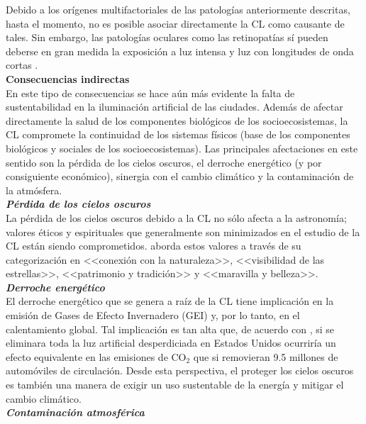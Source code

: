 Debido a los orígenes multifactoriales de las patologías anteriormente descritas, hasta el momento, no es posible asociar directamente la CL como causante de tales. Sin embargo, las patologías oculares como las retinopatías sí pueden deberse en gran medida la exposición a luz intensa y luz con longitudes de onda cortas \citep{CEI2017}.\\


\textbf{Consecuencias indirectas}\\ 

En este tipo de consecuencias se hace aún más evidente la falta de sustentabilidad en la iluminación artificial de las ciudades. Además de afectar directamente la salud de los componentes biológicos de los socioecosistemas, la CL compromete la continuidad de los sistemas físicos (base de los componentes biológicos y sociales de los socioecosistemas). Las principales afectaciones en este sentido son la pérdida de los cielos oscuros, el derroche energético (y por consiguiente económico), sinergia con el cambio climático y la contaminación de la atmósfera.\\ 


\textit{\textbf{Pérdida de los cielos oscuros}}\\ 

La pérdida de los cielos oscuros debido a la CL no sólo afecta a la astronomía; valores éticos y espirituales que generalmente son minimizados en el estudio de la CL están siendo comprometidos. \cite{Stone2017} aborda estos valores a través de su categorización en <<conexión con la naturaleza>>, <<visibilidad de las estrellas>>, <<patrimonio y tradición>> y <<maravilla y belleza>>.\\ 


\textit{\textbf{Derroche energético}}\\ 

El derroche energético que se genera a raíz de la CL tiene implicación en la emisión de Gases de Efecto Invernadero (GEI) y, por lo tanto, en el calentamiento global. Tal implicación es tan alta que, de acuerdo con \cite{Gallaway2010}, si se eliminara toda la luz artificial desperdiciada en Estados Unidos ocurriría un efecto equivalente en las emisiones de CO$_{2}$ que si removieran 9.5 millones de automóviles de circulación. Desde esta perspectiva, el proteger los cielos oscuros es también una manera de exigir un uso sustentable de la energía y mitigar el cambio climático.\\ 

\textit{\textbf{Contaminación atmosférica}}\\ 

